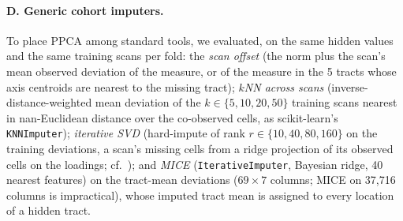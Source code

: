 \documentclass[11pt]{article}
\begin{document}
\paragraph{D. Generic cohort imputers.} To place PPCA among standard tools, we evaluated, on the same hidden values and
the same training scans per fold: the \emph{scan offset} (the norm plus the scan's mean observed deviation of the
measure, or of the measure in the 5 tracts whose axis centroids are nearest to the missing tract); \emph{$k$NN across
scans} \citep{troyanskaya2001knn} (inverse-distance-weighted mean deviation of the $k\in\{5,10,20,50\}$ training scans
nearest in nan-Euclidean distance over the co-observed cells, as scikit-learn's \texttt{KNNImputer}); \emph{iterative
SVD} (hard-impute of rank $r\in\{10,40,80,160\}$ on the training deviations, a scan's missing cells from a ridge
projection of its observed cells on the loadings; cf.\ \citealp{mazumder2010softimpute}); and \emph{MICE}
\citep{vanbuuren2011mice} (\texttt{IterativeImputer}, Bayesian ridge, 40 nearest features) on the tract-mean deviations
($69\times7$ columns; MICE on 37,716 columns is impractical), whose imputed tract mean is assigned to every location of
a hidden tract.
\end{document}
